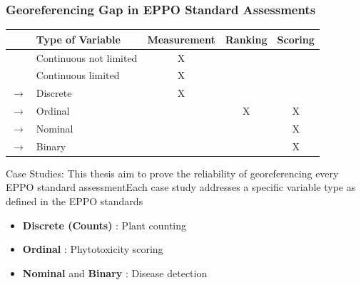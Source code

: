 \documentclass[aspectratio=43]{beamer}
\begin{document}
\begin{frame}
    \frametitle{Georeferencing Gap in EPPO Standard Assessments}
    \begin{table}[ht]
        \centering
        \begin{tabular}{|c|l|c|c|c|}
        \hline
        & \textbf{Type of Variable} & \textbf{Measurement} & \textbf{Ranking} & \textbf{Scoring} \\
        \hline
        \rowcolor{green!20} & Continuous not limited & X & & \\
        \hline
        \rowcolor{green!20} & Continuous limited & X & & \\
        \hline
        \rowcolor{yellow!20} $\rightarrow$ & Discrete & X & & \\
        \hline
        \rowcolor{red!20} $\rightarrow$ & Ordinal & & X & X \\
        \hline
        \rowcolor{red!20} $\rightarrow$ & Nominal & & & X \\
        \hline
        \rowcolor{red!20} $\rightarrow$ & Binary & & & X \\
        \hline
        \end{tabular}
    \end{table}
    \begin{block}{Case Studies:}
        \small This thesis aim to prove the reliability of georeferencing every EPPO standard assessmentEach case study addresses a specific variable type as defined in the EPPO standards
        \begin{itemize}
            \item \textbf{Discrete (Counts)} : Plant counting
            \item \textbf{Ordinal} : Phytotoxicity scoring
            \item \textbf{Nominal} and \textbf{Binary} : Disease detection 
        \end{itemize}
    \end{block}
\end{frame}

\end{document}
